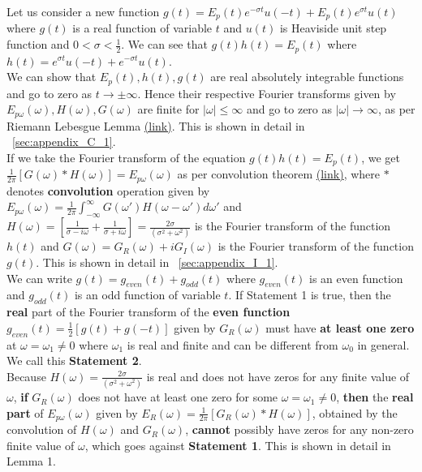 \documentclass[11pt]{elsarticle}
\begin{document}
Let us consider a new function  $g(t) = E_p(t) e^{-\sigma t}  u(-t) + E_p(t) e^{\sigma t}  u(t)  $ where $g(t)$ is a real function of variable $t$ and $u(t)$ is Heaviside unit step function and $0 < \sigma < \frac{1}{2}$. We can see that $g(t) h(t) = E_p(t)$ where $h(t)=  e^{ \sigma t} u(-t) + e^{ - \sigma t} u(t) $. \\

We can show that $E_p(t), h(t), g(t)$ are real absolutely integrable functions and go to zero as $t \to \pm \infty$. Hence their respective Fourier transforms given by $E_{p\omega}(\omega), H(\omega), G(\omega)$ are finite for $|\omega| \leq \infty$ and go to zero as $|\omega| \to \infty$, as per Riemann Lebesgue Lemma \href{https://en.wikipedia.org/wiki/Riemann-Lebesgue\_lemma}{(link)}. This is shown in detail in ~\ref{sec:appendix_C_1}.\\


If we take the Fourier transform of the equation $g(t)  h(t) = E_p(t)$, we get $ \frac{1}{2 \pi}  [ G(\omega) \ast H(\omega)] = E_{p\omega}(\omega)$ as per convolution theorem \href{https://mathworld.wolfram.com/ConvolutionTheorem.html}{(link)}, where $\ast$ denotes \textbf{convolution} operation given by $E_{p\omega}(\omega) =  \frac{1}{2 \pi} \int_{-\infty}^{\infty} G(\omega') H(\omega - \omega') d\omega'$ and $H(\omega)=  [ \frac{1}{  \sigma - i \omega} +  \frac{1}{  \sigma + i \omega}   ]  = \frac{2 \sigma}{(\sigma^{2} + \omega^{2})} $ is the Fourier transform of the function $h(t)$ and $G(\omega)=  G_{R}(\omega) + i G_{I}(\omega)$ is the Fourier transform of the function $g(t)$. This is shown in detail in ~\ref{sec:appendix_I_1}. \\

We can write $g(t)= g_{even}(t) + g_{odd}(t)$ where $g_{even}(t)$ is an even function and $g_{odd}(t)$ is an odd function of variable $t$. If Statement 1 is true, then the \textbf{real} part of the Fourier transform of the \textbf{even function} $g_{even}(t)=\frac{1}{2} [g(t)+g(-t) ] $  given by $G_{R}(\omega)$ must have \textbf{at least one zero} at $\omega = \omega_{1} \neq 0$ where $\omega_{1}$ is real and finite and can be different from $\omega_0$ in general. We call this \textbf{Statement 2}. \\

Because $H(\omega) = \frac{2 \sigma}{(\sigma^{2} + \omega^{2})}$ is real and does not have zeros for any finite value of $\omega$, \textbf{if} $G_{R}(\omega)$ does not have at least one zero for some $\omega  = \omega_{1} \neq 0$, \textbf{then} the \textbf{real part} of $E_{p\omega}(\omega)$ given by $E_{R}(\omega)= \frac{1}{2 \pi}  [ G_{R}(\omega) \ast H(\omega)]$, obtained by the convolution of $H(\omega)$ and $G_{R}(\omega)$, \textbf{cannot} possibly have zeros for any non-zero finite value of $\omega$, which goes against \textbf{Statement 1}. This is shown in detail in Lemma 1. \\
\end{document}

